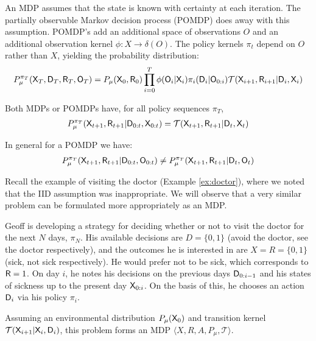 An MDP assumes that the state is known with certainty at each iteration. The partially observable Markov decision process (POMDP) does away with this assumption. POMDP's add an additional space of observations $O$ and an additional observation kernel $\phi:X\to\delta(O)$. The policy kernels $\pi_t$ depend on $O$ rather than $X$, yielding the probability distribution\cite{jaakkola_reinforcement_1994,monahan_state_1982}:
\begin{align}
        P^{\pi_T}_\mu(\mathsf{X}_T,\mathsf{D}_T,\mathsf{R}_T,\mathsf{O}_T)=P_\mu(\mathsf{X}_0,\mathsf{R}_0)\prod_{i=0}^T \phi(\mathsf{O}_i|\mathsf{X}_i) \pi_i(\mathsf{D}_i|\mathsf{O}_{0:i})\mathcal{T}(\mathsf{X}_{i+1},\mathsf{R}_{i+1}|\mathsf{D}_i,\mathsf{X}_i)
\end{align}

Both MDPs or POMDPs have, for all policy sequences $\pi_T$,
\begin{align}
    P^{\pi_T}_\mu(\mathsf{X}_{t+1},\mathsf{R}_{t+1}|\mathsf{D}_{0:t},\mathsf{X}_{0:t}) = \mathcal{T}(\mathsf{X}_{t+1},\mathsf{R}_{t+1}|\mathsf{D}_t,\mathsf{X}_t)
\end{align}

In general for a POMDP we have:
\begin{align}
    P^{\pi_T}_\mu(\mathsf{X}_{t+1},\mathsf{R}_{t+1}|\mathsf{D}_{0:t},\mathsf{O}_{0:t}) \neq P^{\pi_T}_\mu(\mathsf{X}_{t+1},\mathsf{R}_{t+1}|\mathsf{D}_t,\mathsf{O}_t)
\end{align}

Recall the example of visiting the doctor (Example \ref{ex:doctor}), where we noted that the IID assumption was inappropriate. We will observe that a very similar problem can be formulated more appropriately as an MDP. 

\begin{example}
Geoff is developing a strategy for deciding whether or not to visit the doctor for the next $N$ days, $\pi_N$. His available decisions are $D=\{0,1\}$ (avoid the doctor, see the doctor respectively), and the outcomes he is interested in are $X=R=\{0,1\}$ (sick, not sick respectively).  He would prefer not to be sick, which corresponds to $\mathsf{R}=1$. On day $i$, he notes his decisions on the previous days $\mathsf{D}_{0:i-1}$ and his states of sickness up to the present day $\mathsf{X}_{0:i}$. On the basis of this, he chooses an action $\mathsf{D}_i$ via his policy $\pi_i$.

Assuming an environmental distribution $P_\mu(\mathsf{X}_0)$ and transition kernel $\mathcal{T}(\mathsf{X}_{i+1}|\mathsf{X}_i,\mathsf{D}_i)$, this problem forms an MDP $\langle X, R, A, P_\mu, \mathcal{T}\rangle$.
\end{example}

